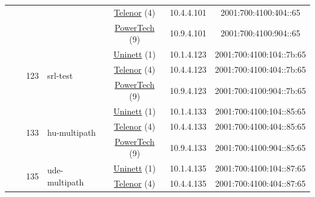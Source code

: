 \begin{small}
\begin{center}
\begin{longtable}{|c|c|c|c|c|c|c|c|}
  &  & \multicolumn{2}{|c|}{} & \multicolumn{2}{|c|}{\tiny{\href{https://www.telenor.no}{Telenor} (4)}} & \tiny{10.4.4.101} & \tiny{2001:700:4100:404::65} \\* \cline{5-5}\cline{6-6}\cline{7-7}\cline{8-8}
  &  & \multicolumn{2}{|c|}{} & \multicolumn{2}{|c|}{\tiny{\href{http://www.powertech.no}{PowerTech} (9)}} & \tiny{10.9.4.101} & \tiny{2001:700:4100:904::65} \\* \cline{3-3}\cline{4-4}\cline{5-5}\cline{6-6}\cline{7-7}\cline{8-8}
  &  & \multirow{3}{*}{\tiny{123}} & \multicolumn{1}{|l|}{\multirow{3}{*}{\tiny{srl-test}}} & \multicolumn{2}{|c|}{\tiny{\href{https://www.uninett.no}{Uninett} (1)}} & \tiny{10.1.4.123} & \tiny{2001:700:4100:104::7b:65} \\* \cline{5-5}\cline{6-6}\cline{7-7}\cline{8-8}
  &  &  &  & \multicolumn{2}{|c|}{\tiny{\href{https://www.telenor.no}{Telenor} (4)}} & \tiny{10.4.4.123} & \tiny{2001:700:4100:404::7b:65} \\* \cline{5-5}\cline{6-6}\cline{7-7}\cline{8-8}
  &  &  &  & \multicolumn{2}{|c|}{\tiny{\href{http://www.powertech.no}{PowerTech} (9)}} & \tiny{10.9.4.123} & \tiny{2001:700:4100:904::7b:65} \\* \cline{3-3}\cline{4-4}\cline{5-5}\cline{6-6}\cline{7-7}\cline{8-8}
  &  & \multirow{3}{*}{\tiny{133}} & \multicolumn{1}{|l|}{\multirow{3}{*}{\tiny{hu-multipath}}} & \multicolumn{2}{|c|}{\tiny{\href{https://www.uninett.no}{Uninett} (1)}} & \tiny{10.1.4.133} & \tiny{2001:700:4100:104::85:65} \\* \cline{5-5}\cline{6-6}\cline{7-7}\cline{8-8}
  &  &  &  & \multicolumn{2}{|c|}{\tiny{\href{https://www.telenor.no}{Telenor} (4)}} & \tiny{10.4.4.133} & \tiny{2001:700:4100:404::85:65} \\* \cline{5-5}\cline{6-6}\cline{7-7}\cline{8-8}
  &  &  &  & \multicolumn{2}{|c|}{\tiny{\href{http://www.powertech.no}{PowerTech} (9)}} & \tiny{10.9.4.133} & \tiny{2001:700:4100:904::85:65} \\* \cline{3-3}\cline{4-4}\cline{5-5}\cline{6-6}\cline{7-7}\cline{8-8}
  &  & \multirow{3}{*}{\tiny{135}} & \multicolumn{1}{|l|}{\multirow{3}{*}{\tiny{ude-multipath}}} & \multicolumn{2}{|c|}{\tiny{\href{https://www.uninett.no}{Uninett} (1)}} & \tiny{10.1.4.135} & \tiny{2001:700:4100:104::87:65} \\* \cline{5-5}\cline{6-6}\cline{7-7}\cline{8-8}
  &  &  &  & \multicolumn{2}{|c|}{\tiny{\href{https://www.telenor.no}{Telenor} (4)}} & \tiny{10.4.4.135} & \tiny{2001:700:4100:404::87:65} \\* \cline{5-5}\cline{6-6}\cline{7-7}\cline{8-8}

\end{longtable}
\end{center}
\end{small}
